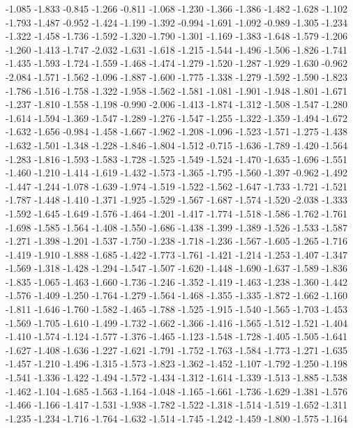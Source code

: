 \documentclass[9pt]{article}
\theoremstyle{plain}
\theoremstyle{definition}
\theoremstyle{remark}
\numberwithin{equation}{section}
\begin{document}
-1.085
-1.833
-0.845
-1.266
-0.811
-1.068
-1.230
-1.366
-1.386
-1.482
-1.628
-1.102
-1.793
-1.487
-0.952
-1.424
-1.199
-1.392
-0.994
-1.691
-1.092
-0.989
-1.305
-1.234
-1.322
-1.458
-1.736
-1.592
-1.320
-1.790
-1.301
-1.169
-1.383
-1.648
-1.579
-1.206
-1.260
-1.413
-1.747
-2.032
-1.631
-1.618
-1.215
-1.544
-1.496
-1.506
-1.826
-1.741
-1.435
-1.593
-1.724
-1.559
-1.468
-1.474
-1.279
-1.520
-1.287
-1.929
-1.630
-0.962
-2.084
-1.571
-1.562
-1.096
-1.887
-1.600
-1.775
-1.338
-1.279
-1.592
-1.590
-1.823
-1.786
-1.516
-1.758
-1.322
-1.958
-1.562
-1.581
-1.081
-1.901
-1.948
-1.801
-1.671
-1.237
-1.810
-1.558
-1.198
-0.990
-2.006
-1.413
-1.874
-1.312
-1.508
-1.547
-1.280
-1.614
-1.594
-1.369
-1.547
-1.289
-1.276
-1.547
-1.255
-1.322
-1.359
-1.494
-1.672
-1.632
-1.656
-0.984
-1.458
-1.667
-1.962
-1.208
-1.096
-1.523
-1.571
-1.275
-1.438
-1.632
-1.501
-1.348
-1.228
-1.846
-1.804
-1.512
-0.715
-1.636
-1.789
-1.420
-1.564
-1.283
-1.816
-1.593
-1.583
-1.728
-1.525
-1.549
-1.524
-1.470
-1.635
-1.696
-1.551
-1.460
-1.210
-1.414
-1.619
-1.432
-1.573
-1.365
-1.795
-1.560
-1.397
-0.962
-1.492
-1.447
-1.244
-1.078
-1.639
-1.974
-1.519
-1.522
-1.562
-1.647
-1.733
-1.721
-1.521
-1.787
-1.448
-1.410
-1.371
-1.925
-1.529
-1.567
-1.687
-1.574
-1.520
-2.038
-1.333
-1.592
-1.645
-1.649
-1.576
-1.464
-1.201
-1.417
-1.774
-1.518
-1.586
-1.762
-1.761
-1.698
-1.585
-1.564
-1.408
-1.550
-1.686
-1.438
-1.399
-1.389
-1.526
-1.533
-1.587
-1.271
-1.398
-1.201
-1.537
-1.750
-1.238
-1.718
-1.236
-1.567
-1.605
-1.265
-1.716
-1.419
-1.910
-1.888
-1.685
-1.422
-1.773
-1.761
-1.421
-1.214
-1.253
-1.407
-1.347
-1.569
-1.318
-1.428
-1.294
-1.547
-1.507
-1.620
-1.448
-1.690
-1.637
-1.589
-1.836
-1.835
-1.065
-1.463
-1.660
-1.736
-1.246
-1.352
-1.419
-1.463
-1.238
-1.360
-1.442
-1.576
-1.409
-1.250
-1.764
-1.279
-1.564
-1.468
-1.355
-1.335
-1.872
-1.662
-1.160
-1.811
-1.646
-1.760
-1.582
-1.465
-1.788
-1.525
-1.915
-1.540
-1.565
-1.703
-1.453
-1.569
-1.705
-1.610
-1.499
-1.732
-1.662
-1.366
-1.416
-1.565
-1.512
-1.521
-1.404
-1.410
-1.574
-1.124
-1.577
-1.376
-1.465
-1.123
-1.548
-1.728
-1.405
-1.505
-1.641
-1.627
-1.408
-1.636
-1.227
-1.621
-1.791
-1.752
-1.763
-1.584
-1.773
-1.271
-1.635
-1.457
-1.210
-1.496
-1.315
-1.573
-1.823
-1.362
-1.452
-1.107
-1.792
-1.250
-1.198
-1.541
-1.336
-1.422
-1.494
-1.572
-1.434
-1.312
-1.614
-1.339
-1.513
-1.885
-1.538
-1.462
-1.104
-1.685
-1.563
-1.164
-1.048
-1.165
-1.661
-1.736
-1.629
-1.381
-1.576
-1.466
-1.166
-1.417
-1.531
-1.938
-1.782
-1.522
-1.318
-1.514
-1.519
-1.652
-1.311
-1.235
-1.234
-1.716
-1.764
-1.632
-1.514
-1.745
-1.242
-1.459
-1.800
-1.575
-1.164
\end{document}
